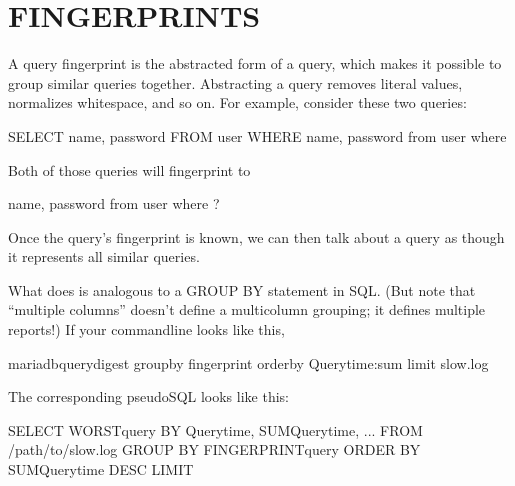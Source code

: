 \documentclass[letterpaper,10pt,english]{sphinxmanual}
\begin{document}
\section{FINGERPRINTS}
\label{\detokenize{mariadb-query-digest:fingerprints}}
A query fingerprint is the abstracted form of a query, which makes it possible
to group similar queries together.  Abstracting a query removes literal values,
normalizes whitespace, and so on.  For example, consider these two queries:

\begin{sphinxVerbatim}[commandchars=\\\{\}]
SELECT name, password FROM user WHERE 
 name,   password from user
   where 
\end{sphinxVerbatim}

Both of those queries will fingerprint to

\begin{sphinxVerbatim}[commandchars=\\\{\}]
 name, password from user where ?
\end{sphinxVerbatim}

Once the query’s fingerprint is known, we can then talk about a query as though
it represents all similar queries.

What  does is analogous to a GROUP BY statement in SQL.  (But
note that “multiple columns” doesn’t define a multi\sphinxhyphen{}column grouping; it defines
multiple reports!) If your command\sphinxhyphen{}line looks like this,

\begin{sphinxVerbatim}[commandchars=\\\{\}]
mariadb\PYGZhy{}query\PYGZhy{}digest               
    \PYGZhy{}\PYGZhy{}group\PYGZhy{}by fingerprint    
    \PYGZhy{}\PYGZhy{}order\PYGZhy{}by Query\PYGZus{}time:sum 
    \PYGZhy{}\PYGZhy{}limit                 
    slow.log
\end{sphinxVerbatim}

The corresponding pseudo\sphinxhyphen{}SQL looks like this:

\begin{sphinxVerbatim}[commandchars=\\\{\}]
SELECT WORSTquery BY Query\PYGZus{}time, SUMQuery\PYGZus{}time, ...
FROM /path/to/slow.log
GROUP BY FINGERPRINTquery
ORDER BY SUMQuery\PYGZus{}time DESC
LIMIT 
\end{sphinxVerbatim}
\end{document}
